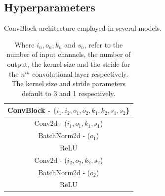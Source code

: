 \subsection{Hyperparameters}\label{sec:hyperparameters}
\begin{table}[h!]
    \footnotesize
    \caption{ConvBlock architecture employed in several models.}
    \label{tab:conv_block}
    \centering
    \vspace{0pt} %
            \begin{tabular}{|cllll|}
            \hline
            \multicolumn{5}{c}{\textbf{ConvBlock - $\{i_1,i_2,o_1,o_2,k_1, k_2,s_1,s_2$\}}} \\ \hline
            \multicolumn{5}{c}{Conv2d - ($i_1,o_1,k_1,s_1$)}             \\ \hline
            \multicolumn{5}{c}{BatchNorm2d - ($o_1$)}        \\ \hline
            \multicolumn{5}{c}{ReLU}               \\ \hline
            \multicolumn{5}{c}{Conv2d - ($i_2,o_2,k_2,s_2$)}             \\ \hline
            \multicolumn{5}{c}{BatchNorm2d - ($o_2$)}        \\ \hline
            \multicolumn{5}{c}{ReLU}               \\ \hline
            \end{tabular}
            \caption{Where $i_n, o_n, k_n$ and $s_n$, refer to the number of input channels, the number of output, the kernel size and the stride for the $n^{th}$ convolutional layer respectively. The kernel size and stride parameters default to 3 and 1 respectively.}
    \end{table}    
\vspace{-1cm}









